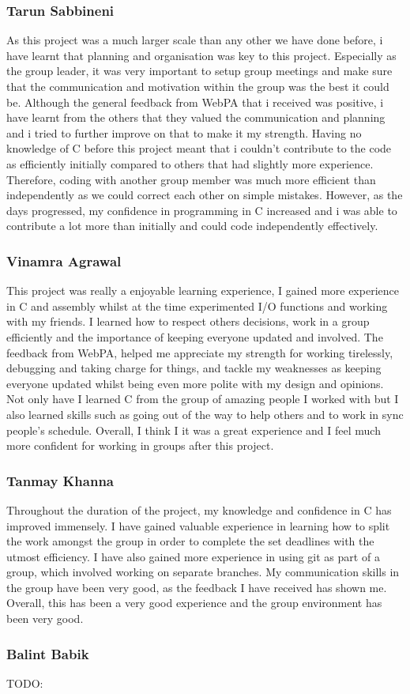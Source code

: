 \documentclass[11pt]{article}
\begin{document}
\subsubsection{Tarun Sabbineni}
As this project was a much larger scale than any other we have done before, i have learnt that planning and organisation was key to this project. Especially as the group leader, it was very important to setup group meetings and make sure that the communication and motivation within the group was the best it could be. Although the general feedback from WebPA that i received was positive, i have learnt from the others that they valued the communication and planning and i tried to further improve on that to make it my strength. Having no knowledge of C before this project meant that i couldn't contribute to the code as efficiently initially compared to others that had slightly more experience. Therefore, coding with another group member was much more efficient than independently as we could correct each other on simple mistakes. However, as the days progressed, my confidence in programming in C increased and i was able to contribute a lot more than initially and could code independently effectively. 


\subsubsection{Vinamra Agrawal}
This project was really a enjoyable learning experience, I gained more experience in C and assembly whilst at the time experimented I/O functions and working with my friends. I learned how to respect others decisions, work in a group efficiently and the importance of keeping everyone updated and involved. The feedback from WebPA, helped me appreciate my  strength for working tirelessly, debugging and taking charge for things, and tackle my weaknesses as keeping everyone updated whilst being even more polite with my design and opinions. Not only have I learned C from the group of amazing people I worked with but I also learned skills such as going out of the way to help others and to work in sync people's schedule.   Overall, I think I it was a great experience and I feel much more confident for working in groups after this project.  


\subsubsection{Tanmay Khanna}
Throughout the duration of the project, my knowledge and confidence in C has improved immensely. I have gained valuable experience in learning how to split the work amongst the group in order to complete the set deadlines with the utmost efficiency. I have also gained more experience in using git as part of a group, which involved working on separate branches. My communication skills in the group have been very good, as the feedback I have received has shown me. Overall, this has been a very good experience and the group environment has been very good.


\subsubsection{Balint Babik}
TODO:
\end{document}
